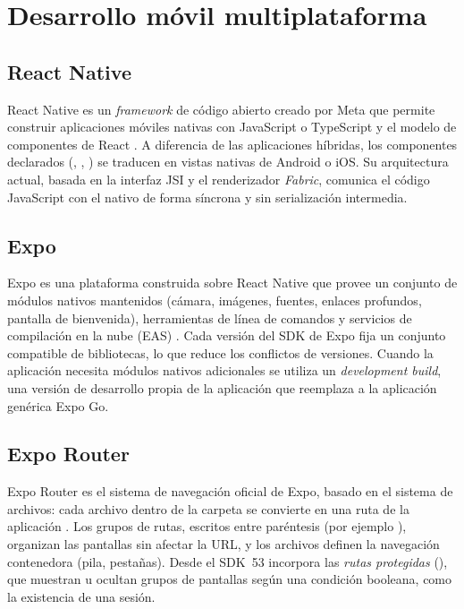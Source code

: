 \section{Desarrollo móvil multiplataforma}
\label{sec:mt-multiplataforma}

\subsection{React Native}

React Native es un \emph{framework} de código abierto creado por Meta que
permite construir aplicaciones móviles nativas con JavaScript o TypeScript y el
modelo de componentes de React \citep{reactnative}. A diferencia de las
aplicaciones híbridas, los componentes declarados (,
, ) se traducen en vistas nativas de Android o
iOS. Su arquitectura actual, basada en la interfaz JSI y el renderizador
\emph{Fabric}, comunica el código JavaScript con el nativo de forma síncrona y
sin serialización intermedia.

\subsection{Expo}

Expo es una plataforma construida sobre React Native que provee un conjunto de
módulos nativos mantenidos (cámara, imágenes, fuentes, enlaces profundos,
pantalla de bienvenida), herramientas de línea de comandos y servicios de
compilación en la nube (EAS) \citep{expo}. Cada versión del SDK de Expo fija un
conjunto compatible de bibliotecas, lo que reduce los conflictos de versiones.
Cuando la aplicación necesita módulos nativos adicionales se utiliza un
\emph{development build}, una versión de desarrollo propia de la aplicación
que reemplaza a la aplicación genérica Expo Go.

\subsection{Expo Router}

Expo Router es el sistema de navegación oficial de Expo, basado en el sistema
de archivos: cada archivo dentro de la carpeta  se convierte en
una ruta de la aplicación \citep{exporouter}. Los grupos de rutas, escritos
entre paréntesis (por ejemplo ), organizan las pantallas sin
afectar la URL, y los archivos  definen la navegación
contenedora (pila, pestañas). Desde el SDK~53 incorpora las \emph{rutas
protegidas} (), que muestran u ocultan grupos de
pantallas según una condición booleana, como la existencia de una sesión.

